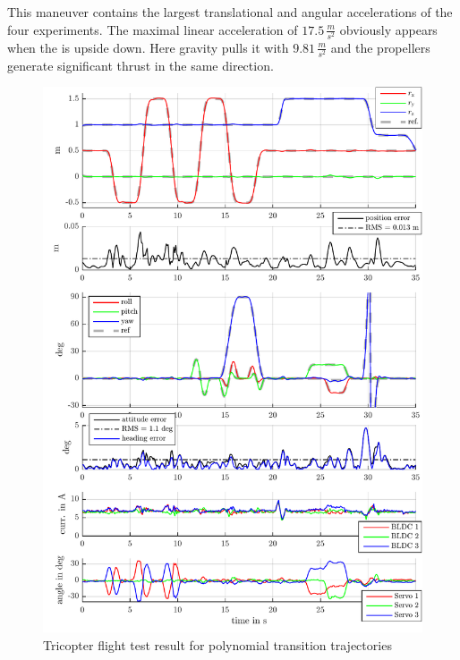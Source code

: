 This maneuver contains the largest translational and angular accelerations of the four experiments.
The maximal linear acceleration of $17.5\,\tfrac{\unit{m}}{\unit{s}^2}$ obviously appears when the \Quadcopter is upside down.
Here gravity pulls it with $9.81\,\tfrac{\unit{m}}{\unit{s}^2}$ and the propellers generate significant thrust in the same direction.

\begin{figure}
 \centering
 \includegraphics{graphics/TriFlightTest/TriManeuver42Result}
 \caption{Tricopter flight test result for polynomial transition trajectories}
 \label{fig:TriManeuver42Result}
\end{figure}

